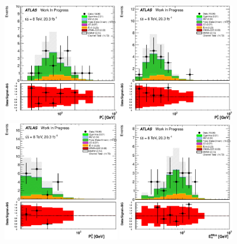 \begin{figure}[tb]
\centering
\includegraphics[width=0.45\textwidth]{figures/Fake_CR/LeadingLeptonPt_histratio.eps}
\includegraphics[width=0.45\textwidth]{figures/Fake_CR/SubleadingLeptonPt_histratio.eps}
\includegraphics[width=0.45\textwidth]{figures/Fake_CR/MinimumLeptonPt_histratio.eps}
\includegraphics[width=0.45\textwidth]{figures/Fake_CR/MET_Et_histratio.eps}

\end{figure}
